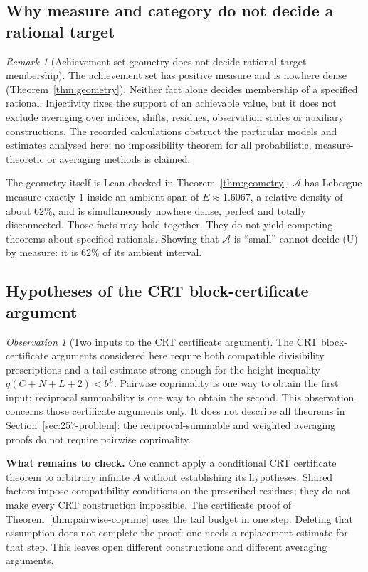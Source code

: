 \documentclass[11pt]{article}
\theoremstyle{plain}
\theoremstyle{definition}
\theoremstyle{remark}
\newtheorem{rem}[thm]{Remark}
\newtheorem{obs}[thm]{Observation}
\begin{document}
\subsection{Why measure and category do not decide a rational target}
\label{bar:measure}

\begin{rem}[Achievement-set geometry does not decide rational-target membership]
\label{prop:soft}
The achievement set has positive measure and is nowhere dense
(Theorem~\ref{thm:geometry}). Neither fact alone decides membership of a specified rational.
Injectivity fixes the support of an achievable value, but it does not exclude averaging over
indices, shifts, residues, observation scales or auxiliary constructions. The recorded
calculations obstruct the particular models and estimates analysed here; no impossibility theorem
for all probabilistic, measure-theoretic or averaging methods is claimed.
\end{rem}

The geometry itself is Lean-checked in Theorem~\ref{thm:geometry}: $\mathcal{A}$ has Lebesgue
measure exactly $1$ inside an ambient span of $E \approx 1.6067$, a relative density of about
$62\%$, and is simultaneously nowhere dense, perfect and totally disconnected. Those facts may hold
together. They do not yield competing theorems about specified rationals. Showing that
$\mathcal{A}$ is ``small'' cannot decide (U) by measure: it is $62\%$ of its ambient interval.

\subsection{Hypotheses of the CRT block-certificate argument}
\label{bar:box}

\begin{obs}[Two inputs to the CRT certificate argument]
\label{obs:box}
The CRT block-certificate arguments considered here require both
compatible divisibility prescriptions and a tail estimate strong enough
for the height inequality $q(C+N+L+2)<b^L$.  Pairwise coprimality is one
way to obtain the first input; reciprocal summability is one way to obtain
the second.  This observation concerns those certificate arguments only.
It does not describe all theorems in Section~\ref{sec:257-problem}:
the reciprocal-summable and weighted averaging proofs do not require
pairwise coprimality.
\end{obs}

\textbf{What remains to check.} One cannot apply a conditional CRT
certificate theorem to arbitrary infinite $A$ without establishing its
hypotheses.  Shared factors impose compatibility conditions on the
prescribed residues; they do not make every CRT construction impossible.
The certificate proof of Theorem~\ref{thm:pairwise-coprime} uses the tail
budget in one step.  Deleting that assumption
does not complete the proof: one needs a replacement estimate for that step.
This leaves open different constructions and different averaging arguments.
\end{document}
